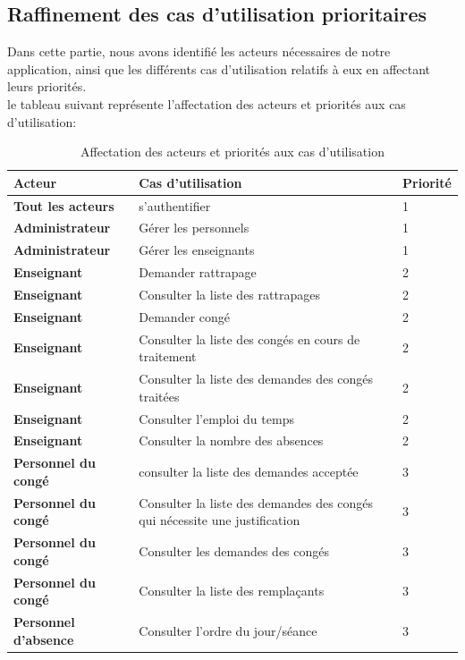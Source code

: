 \documentclass[12 pt]{report}
\begin{document}
\subsection{Raffinement des cas d'utilisation prioritaires}
Dans cette partie, nous avons identifié les acteurs nécessaires de notre application, ainsi que les différents cas d’utilisation relatifs à eux en affectant leurs priorités.
\\ 
le tableau suivant représente l'affectation des acteurs et priorités aux cas d'utilisation:
\begin{table}[htbp]
\begin{center}
\caption{Affectation des acteurs et priorités aux cas d’utilisation \label{table-nom}}
\renewcommand{\arraystretch}{1.7}
\begin{tabular}{|p{5 cm}|p{6 cm}|p{5 cm}|} 
 
\hline 
\cellcolor{PaleTurquoise}\textbf{Acteur} &\cellcolor{PaleTurquoise} \textbf{Cas d’utilisation} &\cellcolor{PaleTurquoise} \textbf{Priorité} \\
\hline
\textbf{Tout les acteurs} & s'authentifier&  1
 \\
\hline
\textbf{Administrateur}&Gérer les personnels& 1 \\
\hline
\textbf{Administrateur}&Gérer les enseignants
& 1 \\
\hline
\textbf{Enseignant}& Demander rattrapage
& 2 \\
\hline
\textbf{Enseignant}& Consulter la liste des rattrapages
& 2 \\
\hline
\textbf{Enseignant}& Demander congé
& 2 \\
\hline
\textbf{Enseignant}& Consulter la liste des congés en cours de traitement
& 2 \\
\hline
\textbf{Enseignant}& Consulter la liste des demandes des congés traitées
& 2 \\
\hline
\textbf{Enseignant}& Consulter l'emploi du temps
& 2 \\
\hline
\textbf{Enseignant}& Consulter la nombre des absences
& 2 \\
\hline

\textbf{Personnel du congé}&   consulter la liste des demandes acceptée & 3 \\
  \hline
\textbf{Personnel du congé}&   Consulter la liste des demandes des congés qui nécessite une justification & 3 \\
\hline
\textbf{Personnel du congé}& Consulter les demandes des congés & 3 \\
 \hline
\textbf{Personnel du congé}&   Consulter la liste des remplaçants & 3 \\
\hline
\textbf{Personnel d'absence}&Consulter l'ordre du jour/séance& 3\\
\hline

\end{tabular}
\end{center}
\end{table}
\newpage
\end{document}
